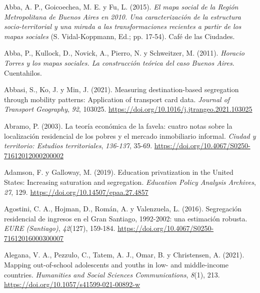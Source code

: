\documentclass[
  spanish,
  a4paper,%
  chapterprefix=true,%
  DIV=calc,%
  twoside]{scrbook}%
\newlength{\cslhangindent}
\newenvironment{CSLReferences}[2] %
 {\begin{list}{}{%
  \setlength{\itemindent}{0pt}
  \setlength{\leftmargin}{0pt}
  \setlength{\parsep}{0pt}
  \ifodd #1
   \setlength{\leftmargin}{\cslhangindent}
   \setlength{\itemindent}{-1\cslhangindent}
  \fi
  \setlength{\itemsep}{#2\baselineskip}}}
 {\end{list}}
\begin{document}

\noindent \setlength{\parindent}{-0.20in}

\label{refs}
\begin{CSLReferences}{1}{0}
Abba, A. P., Goicoechea, M. E. y Fu, L. (2015). \emph{El mapa social de la Región Metropolitana de Buenos Aires en 2010. Una caracterización de la estructura socio-territorial y una mirada a las transformaciones recientes a partir de los mapas sociales} (S. Vidal-Koppmann, Ed.; pp. 17-54). Café de las Ciudades.

Abba, P., Kullock, D., Novick, A., Pierro, N. y Schweitzer, M. (2011). \emph{Horacio Torres y los mapas sociales. La construcción teórica del caso Buenos Aires}. Cuentahilos.

Abbasi, S., Ko, J. y Min, J. (2021). Measuring destination-based segregation through mobility patterns: Application of transport card data. \emph{Journal of Transport Geography}, \emph{92}, 103025. \url{https://doi.org/10.1016/j.jtrangeo.2021.103025}

Abramo, P. (2003). La teoría económica de la favela: cuatro notas sobre la localización residencial de los pobres y el mercado inmobiliario informal. \emph{Ciudad y territorio: Estudios territoriales}, \emph{136-137}, 35-69. \url{https://doi.org/10.4067/S0250-71612012000200002}

Adamson, F. y Galloway, M. (2019). Education privatization in the United States: Increasing saturation and segregation. \emph{Education Policy Analysis Archives}, \emph{27}, 129. \url{https://doi.org/10.14507/epaa.27.4857}

Agostini, C. A., Hojman, D., Román, A. y Valenzuela, L. (2016). Segregación residencial de ingresos en el Gran Santiago, 1992-2002: una estimación robusta. \emph{EURE (Santiago)}, \emph{42}(127), 159-184. \url{https://doi.org/10.4067/S0250-71612016000300007}

Alegana, V. A., Pezzulo, C., Tatem, A. J., Omar, B. y Christensen, A. (2021). Mapping out-of-school adolescents and youths in low- and middle-income countries. \emph{Humanities and Social Sciences Communications}, \emph{8}(1), 213. \url{https://doi.org/10.1057/s41599-021-00892-w}


\end{CSLReferences}
\end{document}

